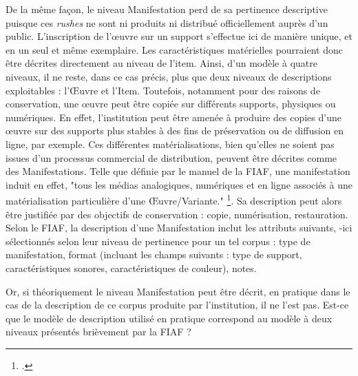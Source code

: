 De la même façon, le niveau Manifestation perd de sa pertinence descriptive puisque ces \textit{rushes} ne sont ni produits ni distribué officiellement auprès d'un public. L'inscription de l'œuvre sur un support s'effectue ici de manière unique, et en un seul et même exemplaire. Les caractéristiques matérielles pourraient donc être décrites directement au niveau de l'item.  Ainsi, d'un modèle à quatre niveaux, il ne reste, dans ce cas précis, plus que deux niveaux de descriptions exploitables : l’Œuvre et l’Item. Toutefois, notamment pour des raisons de conservation, une œuvre peut être copiée sur différents supports, physiques ou numériques. En effet, l'institution peut être amenée à produire des copies d’une œuvre sur des supports plus stables à des fins de préservation ou de diffusion en ligne, par exemple. Ces différentes matérialisations, bien qu'elles ne soient pas issues d'un processus commercial de distribution, peuvent être décrites comme des Manifestations. Telle que définie par le manuel de la FIAF, une manifestation induit en effet, "tous les médias analogiques, numériques et en ligne associés à une matérialisation particulière d'une Œuvre/Variante." \footcite{zotero-item-646}. Sa description peut alors être justifiée par des objectifs de conservation : copie, numérisation, restauration. Selon le FIAF, la description d'une Manifestation inclut les attributs suivants, -ici sélectionnés selon leur niveau de pertinence pour un tel corpus : type de manifestation, format (incluant les champs suivants : type de support, caractéristiques sonores, caractéristiques de couleur), notes.  

Or, si théoriquement le niveau Manifestation peut être décrit, en pratique dans le cas de la description de ce corpus produite par l’institution, il ne l’est pas. Est-ce que le modèle de description utilisé en pratique correspond au modèle à deux niveaux présentés brièvement par la FIAF ?  


